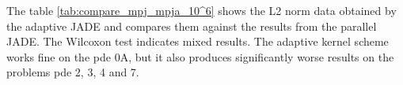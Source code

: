 \documentclass[./\jobname.tex]{subfiles}
\begin{document}
\begin{figure}[H]
	\centering
	\noindent{}
	\label{fig:pajade_memory_boxplot}
\end{figure}

The table \ref{tab:compare_mpj_mpja_10^6} shows the L2 norm data obtained by the adaptive JADE and compares them against the results from the parallel JADE. The Wilcoxon test indicates mixed results. The adaptive kernel scheme works fine on the \gls{pde} 0A, but it also produces significantly worse results on the problems \gls{pde} 2, 3, 4 and 7. 
\end{document}
